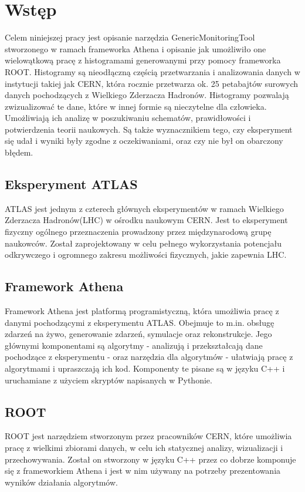 \section{Wstęp}

Celem niniejszej pracy jest opisanie narzędzia \mbox{GenericMonitoringTool} stworzonego w ramach frameworka Athena i opisanie jak umożliwiło one wielowątkową pracę z histogramami generowanymi przy pomocy frameworka ROOT. Histogramy są nieodłączną częścią przetwarzania i analizowania danych w instytucji takiej jak CERN, która rocznie przetwarza ok. 25 petabajtów surowych danych pochodzących z Wielkiego Zderzacza Hadronów. Histogramy pozwalają zwizualizować te dane, które w innej formie są nieczytelne dla człowieka. Umożliwiają ich analizę w poszukiwaniu schematów, prawidłowości i potwierdzenia teorii naukowych. Są także wyznacznikiem tego, czy eksperyment się udał i wyniki były zgodne z oczekiwaniami, oraz czy nie był on obarczony błędem.

\subsection{Eksperyment ATLAS}
ATLAS jest jednym z czterech głównych eksperymentów w ramach Wielkiego Zderzacza Hadronów(LHC) w ośrodku naukowym CERN. Jest to eksperyment fizyczny ogólnego przeznaczenia prowadzony przez międzynarodową grupę naukowców. Został zaprojektowany w celu pełnego wykorzystania potencjału odkrywczego i ogromnego zakresu możliwości fizycznych, jakie zapewnia LHC.

\subsection{Framework Athena}
Framework Athena jest platformą programistyczną, która umożliwia pracę z danymi pochodzącymi z eksperymentu ATLAS. Obejmuje to m.in. obsługę zdarzeń na żywo, generowanie zdarzeń, symulacje oraz rekonstrukcje. Jego głównymi komponentami są algorytmy - analizują i przekształcają dane pochodzące z eksperymentu - oraz narzędzia dla algorytmów - ułatwiają pracę z algorytmami i upraszczają ich kod. Komponenty te pisane są w języku C++ i uruchamiane z użyciem skryptów napisanych w Pythonie. 

\subsection{ROOT}
ROOT jest narzędziem stworzonym przez pracowników CERN, które umożliwia pracę z wielkimi zbiorami danych, w celu ich statycznej analizy, wizualizacji i przechowywania. Został on stworzony w języku C++ przez co dobrze komponuje się z frameworkiem Athena i jest w nim używany na potrzeby prezentowania wyników działania algorytmów. 

